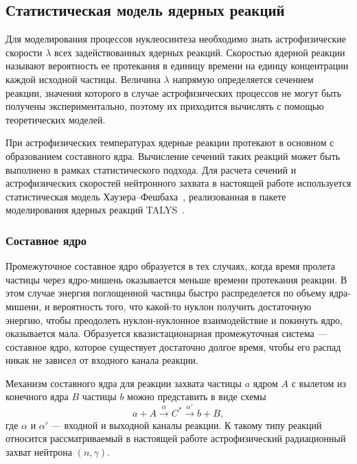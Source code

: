 \subsection{Статистическая модель ядерных реакций}
Для моделирования процессов нуклеосинтеза необходимо знать астрофизические скорости $\lambda$ всех задействованных ядерных реакций. Скоростью ядерной реакции называют вероятность ее протекания в единицу времени на единцу концентрации каждой исходной частицы. Величина $\lambda$ напрямую определяется сечением реакции, значения которого в случае астрофизических процессов не могут быть получены экспериментально, поэтому их приходится вычислять с помощью теоретических моделей.

При астрофизических температурах ядерные реакции протекают в основном с образованием составного ядра. Вычисление сечений таких реакций может быть выполнено в рамках статистического подхода. Для расчета сечений и астрофизических скоростей нейтронного захвата в настоящей работе используется статистическая модель Хаузера--Фешбаха~\cite{hauser1952}, реализованная в пакете моделирования ядерных реакций TALYS~\cite{koning2019}.

\subsubsection{Составное ядро}
Промежуточное составное ядро образуется в тех случаях, когда время пролета частицы через ядро-мишень оказывается меньше времени протекания реакции. В этом случае энергия поглощенной частицы быстро распределется по объему ядра-мишени, и вероятность того, что какой-то нуклон получить достаточную энергию, чтобы преодолеть нуклон-нуклонное взаимодействие и покинуть ядро, оказывается мала. Образуется квазистационарная промежуточная система --- составное ядро, которое существует достаточно долгое время, чтобы его распад никак не зависел от входного канала реакции.

Механизм составного ядра для реакции захвата частицы $a$ ядром $A$ с вылетом из конечного ядра $B$ частицы $b$ можно представить в виде схемы
\begin{equation}
a + A \xrightarrow{\alpha} C^* \xrightarrow{\alpha'} b + B,
\label{eq:reac}
\end{equation}
где $\alpha$ и $\alpha'$ --- входной и выходной каналы реакции. К такому типу реакций относится рассматриваемый в настоящей работе астрофизический радиационный захват нейтрона $(n,\gamma)$. 

